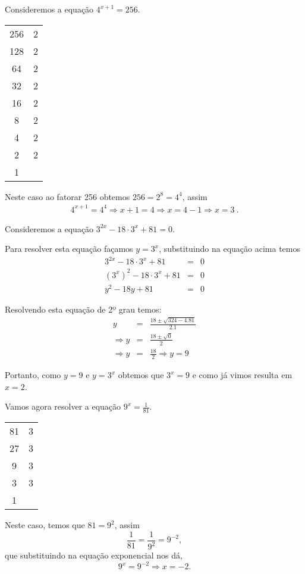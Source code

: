  \begin{exem}
  Consideremos a equação $4^{x+1}= 256$.

  \begin{tabular}{c|c}
   256 & 2 \\
   128 & 2 \\
   64  & 2 \\
   32  & 2 \\
   16  & 2 \\
   8   & 2 \\
   4   & 2 \\
   2   & 2 \\
   1   &   \\
  \end{tabular}

  Neste caso ao fatorar 256 obtemos $256=2^8 =4^4$, assim
  \begin{eqnarray*}
  4^{x+1}= 4^4 \Rightarrow x+1= 4 \Rightarrow x= 4-1 \Rightarrow x=3 \ .
  \end{eqnarray*}

 \end{exem}

 \begin{exem}
  Consideremos a equação $3^{2x}- 18\cdot 3^x + 81=0$.

  Para resolver esta equação façamos $y= 3^x$, substituindo na equação acima temos
  \begin{eqnarray*}
   3^{2x} - 18\cdot 3^x + 81&=& 0 \\
   (3^x)^2 - 18\cdot 3^x + 81&=& 0 \\
   y^2 - 18y + 81 &=& 0
  \end{eqnarray*}

  Resolvendo esta equação de 2º grau temos:
  \begin{eqnarray*}
   y &=& \frac{18 \pm \sqrt{324 - 4.81}}{2.1} \\
   \Rightarrow y&=& \frac{18 \pm \sqrt{0}}{2} \\
   \Rightarrow y&=& \frac{18}{2} \Rightarrow y= 9
  \end{eqnarray*}

  Portanto, como $y= 9$ e $y= 3^x$ obtemos que $3^x= 9$ e como já vimos resulta em $x= 2$.

 \end{exem}

 \begin{exem}
  Vamos agora resolver a equação $9^x= \frac{1}{81}$.

  \begin{tabular}{c|c}
   81 & 3 \\
   27 & 3 \\
   9  & 3 \\
   3  & 3 \\
   1  &   \\
  \end{tabular}

  Neste caso, temos que $81= 9^2$, assim
  \[\frac{1}{81}= \frac{1}{9^2}= 9^{-2} ,\]
  que substituindo na equação exponencial nos dá,
  \[9^x= 9^{-2} \Rightarrow x= -2 .\]
 \end{exem}

